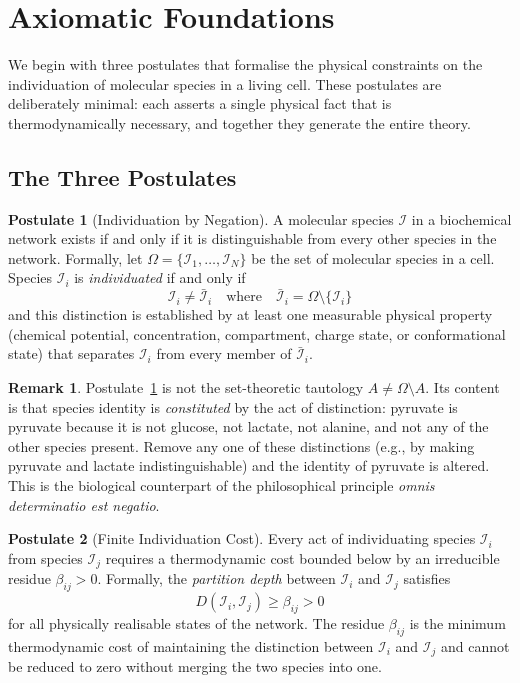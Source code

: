 \documentclass[11pt,twocolumn]{article}
\theoremstyle{plain}
\theoremstyle{definition}
\newtheorem{remark}[theorem]{Remark}
\newtheorem{postulate}{Postulate}
\begin{document}
\section{Axiomatic Foundations}
\label{sec:foundations}

We begin with three postulates that formalise the physical constraints on the
individuation of molecular species in a living cell. These postulates are
deliberately minimal: each asserts a single physical fact that is
thermodynamically necessary, and together they generate the entire theory.

\subsection{The Three Postulates}

\begin{postulate}[Individuation by Negation]
\label{post:negation}
A molecular species $\mathcal{I}$ in a biochemical network exists if and only if
it is distinguishable from every other species in the network. Formally, let
$\Omega = \{\mathcal{I}_1, \ldots, \mathcal{I}_N\}$ be the set of molecular
species in a cell. Species $\mathcal{I}_i$ is \emph{individuated} if and only if
\[
  \mathcal{I}_i \neq \bar{\mathcal{I}}_i
  \quad\text{where}\quad
  \bar{\mathcal{I}}_i = \Omega \setminus \{\mathcal{I}_i\}
\]
and this distinction is established by at least one measurable physical
property (chemical potential, concentration, compartment, charge state, or
conformational state) that separates $\mathcal{I}_i$ from every member of
$\bar{\mathcal{I}}_i$.
\end{postulate}

\begin{remark}
Postulate~\ref{post:negation} is not the set-theoretic tautology $A \neq
\Omega \setminus A$. Its content is that species identity is \emph{constituted}
by the act of distinction: pyruvate is pyruvate because it is not glucose, not
lactate, not alanine, and not any of the other species present. Remove any one
of these distinctions (e.g., by making pyruvate and lactate indistinguishable)
and the identity of pyruvate is altered. This is the biological counterpart of
the philosophical principle \emph{omnis determinatio est negatio}.
\end{remark}

\begin{postulate}[Finite Individuation Cost]
\label{post:cost}
Every act of individuating species $\mathcal{I}_i$ from species $\mathcal{I}_j$
requires a thermodynamic cost bounded below by an irreducible residue
$\beta_{ij} > 0$. Formally, the \emph{partition depth} between
$\mathcal{I}_i$ and $\mathcal{I}_j$ satisfies
\[
  D(\mathcal{I}_i, \mathcal{I}_j) \geq \beta_{ij} > 0
\]
for all physically realisable states of the network. The residue $\beta_{ij}$
is the minimum thermodynamic cost of maintaining the distinction between
$\mathcal{I}_i$ and $\mathcal{I}_j$ and cannot be reduced to zero without
merging the two species into one.
\end{postulate}
\end{document}
